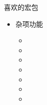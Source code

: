 \begin{frame}[fragile]{喜欢的宏包}
\begin{multicols}{3}
\begin{itemize}
			      \begin{itemize}
				      \item {}
				      \item {}
				      \item {}
				      \item {}
			      \end{itemize}
			\item 杂项功能

			      \begin{itemize}
				      \item {}
				      \item {}
				      \item {}
				      \item {}
				      \item {}
				      \item {}
				      \item {}
			      \end{itemize}
		\end{itemize}
	\end{multicols}
\end{frame}